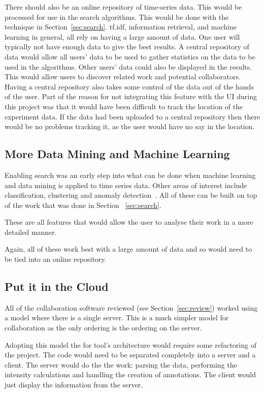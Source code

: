 There should also be an online repository of time-series data.  This would be processed for use in the search algorithms.  This would be done with the technique in Section~\ref{sec:search}.  \ac{tf.idf}, information retrieval, and machine learning in general, all rely on having a large amount of data.  One user will typically not have enough data to give the best results.  A central repository of data would allow all users' data to be used to gather statistics on the data to be used in the algorithms.  Other users' data could also be displayed in the results.  This would allow users to discover related work and potential collaborators.  Having a central repository also takes some control of the data out of the hands of the user.  Part of the reason for not integrating this feature with the \ac{UI} during this project was that it would have been difficult to track the location of the experiment data.  If the data had been uploaded to a central repository then there would be no problems tracking it, as the user would have no say in the location.

\subsection{More Data Mining and Machine Learning}

Enabling search was an early step into what can be done when machine learning and data mining is applied to time series data.  Other areas of interest include classification, clustering and anomaly detection~\cite{esling, chotirat}.  All of these can be built on top of the work that was done in Section ~\ref{sec:search}.

These are all features that would allow the user to analyse their work in a more detailed manner.

Again, all of these work best with a large amount of data and so would need to be tied into an online repository.

\subsection{Put it in the Cloud}
\label{sec:cloud}
All of the collaboration software reviewed (see Section~\ref{sec:review}) worked using a model where there is a single server.  This is a much simpler model for collaboration as the only ordering is the ordering on the server.

Adopting this model the for tool's architecture would require some refactoring of the project.  The code would need to be separated completely into a server and a client.  The server would do the the work: parsing the data, performing the intensity calculations and handling the creation of annotations.  The client would just display the information from the server.

